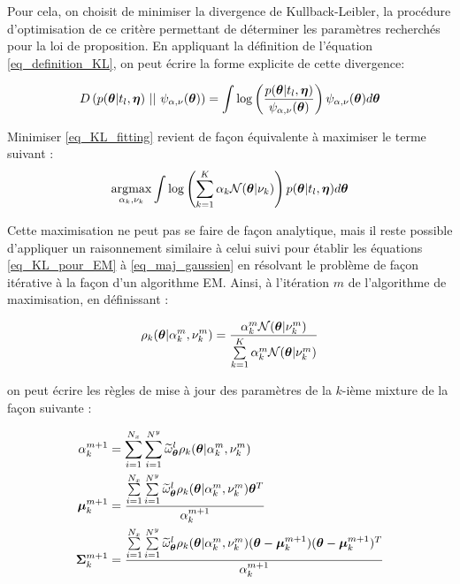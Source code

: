 Pour cela, on choisit de minimiser la divergence de Kullback-Leibler, la procédure d'optimisation de ce critère permettant de déterminer les paramètres recherchés pour la loi de proposition. En appliquant la définition de l'équation \eqref{eq_definition_KL}, on peut écrire la forme explicite de cette divergence: 

\begin{equation}
D\left(p({\bm{\theta}}|t_l,{\bm{\eta}}) ~ || ~ \psi_{\alpha, \nu}({\bm{\theta}})\right) = \int \log \left(\dfrac{p({\bm{\theta}}|t_l,{\bm{\eta}})}{ \psi_{\alpha, \nu}({\bm{\theta}})}\right) \psi_{\alpha, \nu}({\bm{\theta}}) d{\bm{\theta}}
\label{eq_KL_fitting}
\end{equation}

Minimiser \eqref{eq_KL_fitting} revient de façon équivalente à maximiser le terme suivant : 
\begin{equation}
\operatorname*{\arg\!\max}_{\alpha_k, \nu_k} \int \log \left(\sum\limits_{k=1}^K \alpha_k \mathcal{N}({\bm{\theta}} | \nu_k) \right)p({\bm{\theta}}|t_l,{\bm{\eta}}) d{\bm{\theta}}
\end{equation}

Cette maximisation ne peut pas se faire de façon analytique, mais il reste possible d'appliquer un raisonnement similaire à celui suivi pour établir les équations \eqref{eq_KL_pour_EM} à  \eqref{eq_maj_gaussien} en résolvant le problème de façon itérative à la façon d'un algorithme EM. Ainsi, à l'itération $m$ de l'algorithme de maximisation, en définissant : 

\begin{equation}
\rho_k ({\bm{\theta}} | \alpha_k^m,\nu_k^m) = \dfrac{\alpha_k^m \mathcal{N}({\bm{\theta}}|\nu_k^m)}{\sum\limits_{k=1}^K \alpha_k^m \mathcal{N}({\bm{\theta}}|\nu_k^m)}
\end{equation}

on peut écrire les règles de mise à jour des paramètres de la $k$-ième mixture de la façon suivante : 

\begin{equation}
\begin{split}
\alpha_k^{m+1} &= \sum\limits_{i=1}^{N_x} \sum\limits_{i=1}^{N^y} \widetilde{\omega}_{\bm{\theta}}^l \rho_k ({\bm{\theta}} | \alpha_k^m,\nu_k^m) \\
{\bm{\mu}}_k^{m+1} &= \dfrac{\sum\limits_{i=1}^{N_x} \sum\limits_{i=1}^{N^y} \widetilde{\omega}_{\bm{\theta}}^l \rho_k ({\bm{\theta}} | \alpha_k^m,\nu_k^m) {\bm{\theta}}^T}{\alpha_k^{m+1}} \\
{\bm{\Sigma}}_k^{m+1} &= \dfrac{\sum\limits_{i=1}^{N_x} \sum\limits_{i=1}^{N^y} \widetilde{\omega}_{\bm{\theta}}^l \rho_k ({\bm{\theta}} | \alpha_k^m,\nu_k^m) ({\bm{\theta}} - {\bm{\mu}}_k^{m+1} )({\bm{\theta}} - {\bm{\mu}}_k^{m+1} )^T}{\alpha_k^{m+1}}
\end{split}
\end{equation}

